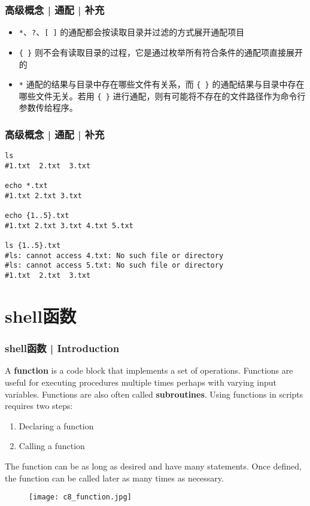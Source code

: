 \begin{frame}[fragile]
  \frametitle{高级概念 | 通配 | 补充}
  \begin{itemize}
    \item \verb|*|、\verb|?|、\verb|[ ]| 的通配都会按读取目录并过滤的方式展开通配项目
    \item \verb|{ }| 则不会有读取目录的过程，它是通过枚举所有符合条件的通配项直接展开的
    \item \verb|*| 通配的结果与目录中存在哪些文件有关系，而 \verb|{ }| 的通配结果与目录中存在哪些文件无关。若用 \verb|{ }| 进行通配，则有可能将不存在的文件路径作为命令行参数传给程序。
  \end{itemize}
\end{frame}

\begin{frame}[fragile]
  \frametitle{高级概念 | 通配 | 补充}
\begin{lstlisting}
ls
#1.txt  2.txt  3.txt

echo *.txt
#1.txt 2.txt 3.txt

echo {1..5}.txt
#1.txt 2.txt 3.txt 4.txt 5.txt

ls {1..5}.txt
#ls: cannot access 4.txt: No such file or directory
#ls: cannot access 5.txt: No such file or directory
#1.txt  2.txt  3.txt
\end{lstlisting}
\end{frame}

\section{shell函数}
\begin{frame}
  \frametitle{shell函数 | Introduction}
  A \textbf{function} is a code block that implements a set of operations.  Functions are useful for executing procedures multiple times perhaps with varying input variables. Functions are also often called \textbf{subroutines}. Using functions in scripts requires two steps:
  \begin{enumerate}
    \item Declaring a function
    \item Calling a function
  \end{enumerate}
  The function can be as long as desired and have many statements. Once defined, the function can be called later as many times as necessary.
  \begin{figure}
    \centering
    \texttt{[image: c8\_function.jpg]}
  \end{figure}
\end{frame}


